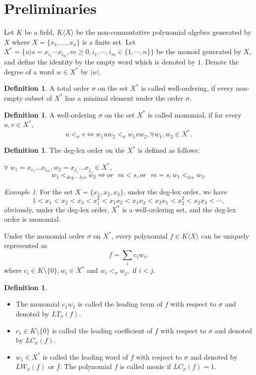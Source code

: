 \documentclass[UTF8]{amsart}
\theoremstyle{definition}
\newtheorem{definition}[tpcl]{Definition}
\theoremstyle{remark}
\newtheorem{example}[tpcl]{Example}
\numberwithin{equation}{section}
\begin{document}
\section{Preliminaries}\label{pre}
Let $K$ be a field,  $K\langle X\rangle$ be the non-commutative polynomial algebra generated by $X$ where $X=\{x_1,...,x_n\}$ is a finite set. Let $X^*=\{u|u=x_{i_1}\cdots x_{i_m},m\ge 0, i_1,\cdots,i_m \in \{1,\cdots,n\}\}$ be the monoid generated by $X$, and define the identity by the empty word  which is denoted by $1$.
Denote the degree of a word $w\in X^*$ by $|w|$.
\begin{definition}
A total order $\sigma$ on the set $X^*$ is called well-ordering, if every non-empty subset of $X^*$ has a minimal element under the order $\sigma$.
\end{definition}
\begin{definition}
A well-ordering $\sigma$ on the set $X^*$ is called monomial, if for every $u,v\in X^*$,
$$
u<_\sigma v \iff w_1uw_2<_\sigma w_1vw_2,\forall w_1,w_2\in X^*.
$$
\end{definition}
\begin{definition}
The deg-lex order on the $X^*$ is defined as follows: \par
$\forall ~ w_1=x_{i_1}...x_{i_m},w_2=x_{j_1}...x_{j_s}\in X^*$,
$$
w_1<_{deg-lex}w_2 \iff or\mbox{ } m<s, or \mbox{ }m=s,w_1<_{lex}w_2.
$$
\end{definition}
\begin{example}
For the set $X=\{x_1,x_2,x_3\}$, under the deg-lex order, we have
$$
1<x_1<x_2<x_3<x_1^2<x_1x_2<x_1x_3<x_2x_1<x_2^2<x_2x_3<\cdots ,
$$
obviously, under the  deg-lex order, $X^*$ is a well-ordering set, and the  deg-lex order is monomial.
\end{example}
Under the  monomial order $\sigma$ on  $X^*$, every  polynomial $f\in K\langle X\rangle$ can be  uniquely represented as
$$
f=\sum_{i}c_iw_i,
$$
where $c_i\in K\setminus\{0\},w_i\in X^*$ and  $w_i<_{\sigma}w_j,\mbox{ if } i<j$.
\begin{definition}
\begin{itemize}
\item The monomial $c_1w_1$ is called the leading term of $f$ with respect to $\sigma$ and  denoted  by $LT_\sigma(f)$. \par
\item $c_1\in  K\setminus\{0\}$ is called the leading coefficient of $f$ with respect to  $\sigma$ and denoted  by $LC_\sigma(f)$. \par
\item $w_1\in X^*$ is called the leading word of $f$ with respect to  $\sigma$ and denoted  by $LW_\sigma(f)$ or $\bar{f}$.
The polynomial $f$ is called monic if $LC_\sigma(f)=1$.
\end{itemize}
\end{definition}
\end{document}
